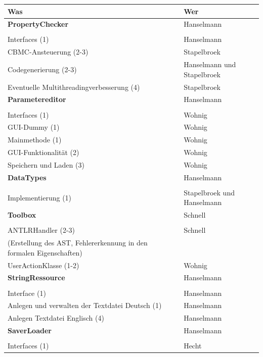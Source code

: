 \documentclass[a4paper]{scrreprt}
\begin{document}
\begin{tabular}{ | p{7cm} | p{7cm} |}
	\hline
	Was & Wer\\
	\hline
	
	\rule{0pt}{15pt}\textbf {PropertyChecker} & Hanselmann\\
	&\\
	\hline
	Interfaces (1) & Hanselmann\\
	\hline
	CBMC-Ansteuerung (2-3) & Stapelbroek \\
	\hline
	Codegenerierung (2-3) & Hanselmann und Stapelbroek \\
	\hline
	Eventuelle Multithreadingverbesserung (4) & Stapelbroek \\
	\hline
	
	\rule{0pt}{15pt}\textbf {Parametereditor} & Hanselmann \\
	&\\
	\hline
	Interfaces (1) & Wohnig\\
	\hline
	GUI-Dummy (1) & Wohnig\\
	\hline
	Mainmethode (1) & Wohnig\\
	\hline
	GUI-Funktionalität (2) & Wohnig\\
	\hline
	Speichern und Laden (3) & Wohnig\\
	\hline
	
	\rule{0pt}{15pt}\textbf {DataTypes} & Hanselmann\\
	&\\
	\hline
	Implementierung (1) & Stapelbroek und Hanselmann\\
	\hline	
	
	\rule{0pt}{15pt}\textbf {Toolbox} & Schnell\\
	&\\
	\hline	
	ANTLRHandler (2-3)  & Schnell\\
	(Erstellung des AST, Fehlererkennung in den formalen Eigenschaften) &\\
	\hline
	UserActionKlasse (1-2) & Wohnig\\
	\hline
	
	\rule{0pt}{15pt}\textbf {StringRessource} & Hanselmann\\
	&\\
	\hline	
	Interface (1) & Hanselmann \\
	\hline
	Anlegen und verwalten der Textdatei Deutsch (1) & Hanselmann \\
	\hline
	Anlegen Textdatei Englisch (4) & Hanselmann \\
	\hline
	
	\rule{0pt}{15pt}\textbf {SaverLoader} & Hanselmann\\
	&\\
	\hline
	Interfaces (1) & Hecht\\
	

\end{tabular}
\end{document}
